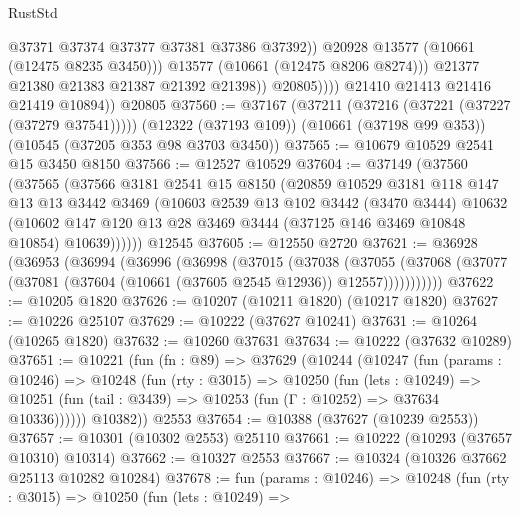 \begin{lexlean}{RustStd}
\begin{coremodule}
                            @37371
                            @37374
                            @37377
                            @37381
                            @37386
                            @37392))
                        @20928
                        @13577
                        (@10661 (@12475 @8235 @3450)))
                      @13577
                      (@10661 (@12475 @8206 @8274)))
                    @21377
                    @21380
                    @21383
                    @21387
                    @21392
                    @21398))
                @20805))))
        @21410
        @21413
        @21416
        @21419
        @10894))
    @20805
@37560 := @37167
    (@37211 (@37216 (@37221 (@37227 (@37279 @37541)))))
    (@12322 (@37193 @109))
    (@10661 (@37198 @99 @353))
    (@10545 (@37205 @353 @98 @3703 @3450))
@37565 := @10679 @10529 @2541 @15 @3450 @8150
@37566 := @12527 @10529
@37604 := @37149
    (@37560
      (@37565
        (@37566
          @3181
          @2541
          @15
          @8150
          (@20859
            @10529
            @3181
            @118
            @147
            @13
            @13
            @3442
            @3469
            (@10603
              @2539
              @13
              @102
              @3442
              (@3470 @3444)
              @10632
              (@10602 @147 @120 @13 @28 @3469 @3444 (@37125 @146 @3469 @10848 @10854) @10639))))))
    @12545
@37605 := @12550 @2720
@37621 := @36928
    (@36953
      (@36994
        (@36996
          (@36998
            (@37015
              (@37038
                (@37055
                  (@37068 (@37077 (@37081 (@37604 (@10661 (@37605 @2545 @12936)) @12557)))))))))))
@37622 := @10205 @1820
@37626 := @10207 (@10211 @1820) (@10217 @1820)
@37627 := @10226 @25107
@37629 := @10222 (@37627 @10241)
@37631 := @10264 (@10265 @1820)
@37632 := @10260 @37631
@37634 := @10222 (@37632 @10289)
@37651 := @10221
    (fun (fn : @89) =>
    @37629
      (@10244
        (@10247
          (fun (params : @10246) =>
          @10248
            (fun (rty : @3015) =>
            @10250
              (fun (lets : @10249) =>
              @10251 (fun (tail : @3439) => @10253 (fun (Γ : @10252) => @37634 @10336))))))
        @10382))
    @2553
@37654 := @10388 (@37627 (@10239 @2553))
@37657 := @10301 (@10302 @2553) @25110
@37661 := @10222 (@10293 (@37657 @10310) @10314)
@37662 := @10327 @2553
@37667 := @10324 (@10326 @37662 @25113 @10282 @10284)
@37678 := fun (params : @10246) =>
  @10248
    (fun (rty : @3015) =>
    @10250
      (fun (lets : @10249) =>

\end{coremodule}
\end{lexlean}
